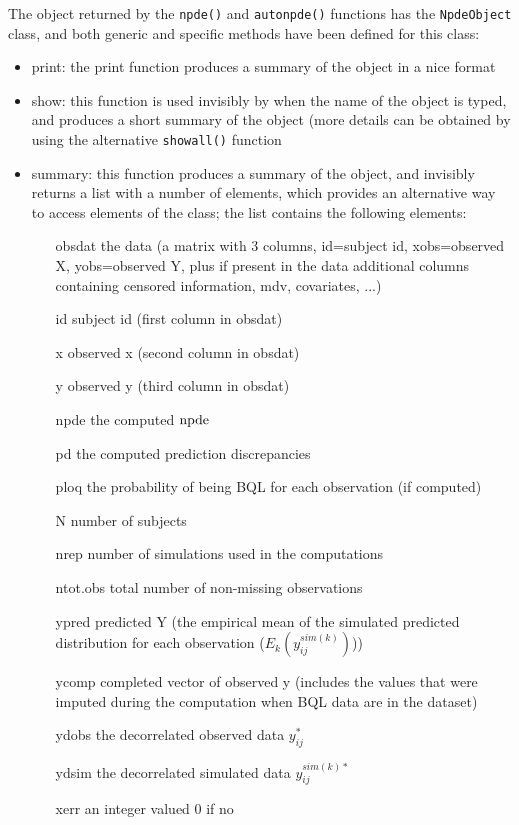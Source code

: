 The object returned by the \texttt{npde()} and \texttt{autonpde()} functions has the \texttt{NpdeObject} class, and 
both generic and specific methods have been defined for this class: \begin{itemize} \item print: the print function 
produces a summary of the object in a nice format \item show: this function is used invisibly by \R when the name 
of the object is typed, and produces a short summary of the object (more details can be obtained by using the 
alternative \texttt{showall()} function \item summary: this function produces a summary of the object, and 
invisibly returns a list with a number of elements, which provides an alternative way to access elements of the 
class; the list contains the following elements: \begin{itemize} \item[obsdat] the data (a matrix with 3 columns, 
id=subject id, xobs=observed X, yobs=observed Y, plus if present in the data additional columns containing censored 
information, mdv, covariates, ...) \item[id] subject id (first column in obsdat) \item[x] observed x (second column 
in obsdat) \item[y] observed y (third column in obsdat) \item[npde] the computed ${\rm npde}$ \item[pd] the computed 
prediction discrepancies \item[ploq] the probability of being BQL for each observation (if computed) \item[N] 
number of subjects \item[nrep] number of simulations used in the computations \item[ntot.obs] total number of 
non-missing observations \item[ypred] predicted Y (the empirical mean of the simulated predicted distribution for 
each observation ($E_k(y^{sim(k)}_{ij})$)) \item[ycomp] completed vector of observed y (includes the values that 
were imputed during the computation when BQL data are in the dataset) \item[ydobs] the decorrelated observed data 
$y_{ij}^*$ \item[ydsim] the decorrelated simulated data $y^{sim(k)*}_{ij}$ \item[xerr] an integer valued 0 if no 

\end{itemize}
\end{itemize}
